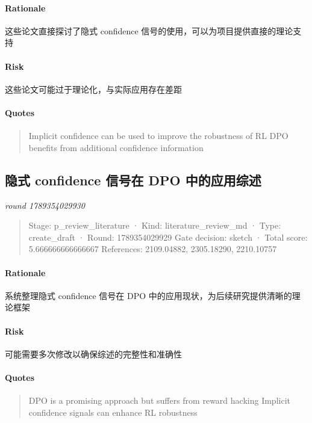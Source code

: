 \documentclass{article}
\begin{document}
\paragraph{Rationale}

这些论文直接探讨了隐式 confidence 信号的使用，可以为项目提供直接的理论支持

\paragraph{Risk}

这些论文可能过于理论化，与实际应用存在差距

\paragraph{Quotes}
\begin{quote}
Implicit confidence can be used to improve the robustness of RL
DPO benefits from additional confidence information
\end{quote}

\subsection{隐式 confidence 信号在 DPO 中的应用综述}
\textit{round 1789354029930}\\
\begin{quote}
Stage: p\_review\_literature  ·  Kind: literature\_review\_md  ·  Type: create\_draft  ·  Round: 1789354029929
Gate decision: sketch  ·  Total score: 5.666666666666667
References: 2109.04882, 2305.18290, 2210.10757
\end{quote}

\paragraph{Rationale}

系统整理隐式 confidence 信号在 DPO 中的应用现状，为后续研究提供清晰的理论框架

\paragraph{Risk}

可能需要多次修改以确保综述的完整性和准确性

\paragraph{Quotes}
\begin{quote}
DPO is a promising approach but suffers from reward hacking
Implicit confidence signals can enhance RL robustness
\end{quote}
\end{document}
